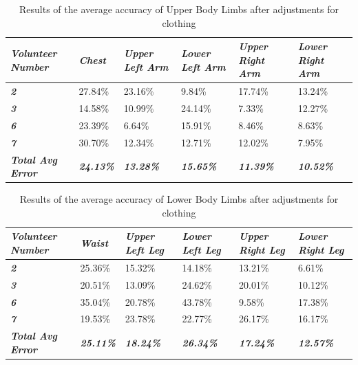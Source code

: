 \begin{table}[htbp]
	\centering
	\caption{Results of the average accuracy of Upper Body Limbs after adjustments for clothing}
	\begin{tabularx}{\textwidth}{|Y|Y|Y|Y|Y|Y|}
		\toprule
		\textit{\textbf{Volunteer Number}} & \textit{\textbf{Chest}} & \textit{\textbf{Upper Left Arm}} & \textit{\textbf{Lower Left Arm}} & \textit{\textbf{Upper Right Arm}} & \textit{\textbf{Lower Right Arm}} \\
		\midrule
		\textit{\textbf{2}} & 27.84\% & 23.16\% & 9.84\% & 17.74\% & 13.24\% \\
		\midrule
		\textit{\textbf{3}} & 14.58\% & 10.99\% & 24.14\% & 7.33\% & 12.27\% \\
		\midrule
		\textit{\textbf{6}} & 23.39\% & 6.64\% & 15.91\% & 8.46\% & 8.63\% \\
		\midrule
		\textit{\textbf{7}} & 30.70\% & 12.34\% & 12.71\% & 12.02\% & 7.95\% \\
		\midrule
		\textit{\textbf{Total Avg Error}} & \textit{\textbf{24.13\%}} & \textit{\textbf{13.28\%}} & \textit{\textbf{15.65\%}} & \textit{\textbf{11.39\%}} & \textit{\textbf{10.52\%}} \\
		\bottomrule
	\end{tabularx}%
	\label{tab:upperBodyResultsClothingAdj}%
\end{table}%

\begin{table}[htbp]
	\centering
	\caption{Results of the average accuracy of Lower Body Limbs after adjustments for clothing}
	\begin{tabularx}{\textwidth}{|Y|Y|Y|Y|Y|Y|}
		\toprule
		\textit{\textbf{Volunteer Number}} & \textit{\textbf{Waist}} & \textit{\textbf{Upper Left Leg}} & \textit{\textbf{Lower Left Leg}} & \textit{\textbf{Upper Right Leg}} & \textit{\textbf{Lower Right Leg}} \\
		\midrule
		\textit{\textbf{2}} & 25.36\% & 15.32\% & 14.18\% & 13.21\% & 6.61\% \\
		\midrule
		\textit{\textbf{3}} & 20.51\% & 13.09\% & 24.62\% & 20.01\% & 10.12\% \\
		\midrule
		\textit{\textbf{6}} & 35.04\% & 20.78\% & 43.78\% & 9.58\% & 17.38\% \\
		\midrule
		\textit{\textbf{7}} & 19.53\% & 23.78\% & 22.77\% & 26.17\% & 16.17\% \\
		\midrule
		\textit{\textbf{Total Avg Error}} & \textit{\textbf{25.11\%}} & \textit{\textbf{18.24\%}} & \textit{\textbf{26.34\%}} & \textit{\textbf{17.24\%}} & \textit{\textbf{12.57\%}} \\
		\bottomrule
	\end{tabularx}%
	\label{tab:lowerBodyResultsClothingAdj}%
\end{table}%

